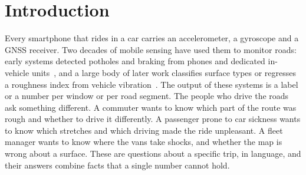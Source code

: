 \providecommand{\TBD}[1][]{\textcolor{red}{[TBD#1]}}

\section{Introduction}
\label{sec:intro}

Every smartphone that rides in a car carries an accelerometer, a gyroscope and a GNSS receiver.
Two decades of mobile sensing have used them to monitor roads: early systems detected potholes and braking from phones and dedicated in-vehicle units~\cite{mohan2008nericell,eriksson2008pothole}, and a large body of later work classifies surface types or regresses a roughness index from vehicle vibration~\cite{menegazzo2021pvs}.
The output of these systems is a label or a number per window or per road segment.
The people who drive the roads ask something different.
A commuter wants to know which part of the route was rough and whether to drive it differently.
A passenger prone to car sickness wants to know which stretches and which driving made the ride unpleasant.
A fleet manager wants to know where the vans take shocks, and whether the map is wrong about a surface.
These are questions about a specific trip, in language, and their answers combine facts that a single number cannot hold.

